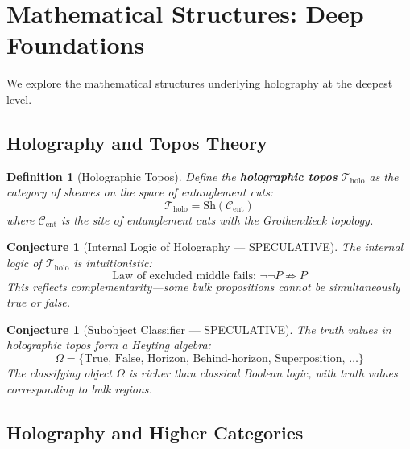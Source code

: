 \documentclass[12pt,a4paper]{article}
\newtheorem{conjecture}[theorem]{Conjecture}
\newtheorem{definition}[theorem]{Definition}
\begin{document}
\section{Mathematical Structures: Deep Foundations}

We explore the mathematical structures underlying holography at the deepest level.

\subsection{Holography and Topos Theory}

\begin{definition}[Holographic Topos]
Define the \textbf{holographic topos} $\mathcal{T}_{\text{holo}}$ as the category of sheaves on the space of entanglement cuts:
\begin{equation}
\mathcal{T}_{\text{holo}} = \text{Sh}(\mathcal{C}_{\text{ent}})
\end{equation}
where $\mathcal{C}_{\text{ent}}$ is the site of entanglement cuts with the Grothendieck topology.
\end{definition}

\begin{conjecture}[Internal Logic of Holography --- SPECULATIVE]
The internal logic of $\mathcal{T}_{\text{holo}}$ is intuitionistic:
\begin{equation}
\text{Law of excluded middle fails: } \neg\neg P \not\Rightarrow P
\end{equation}
This reflects complementarity---some bulk propositions cannot be simultaneously true or false.
\end{conjecture}

\begin{conjecture}[Subobject Classifier --- SPECULATIVE]
The truth values in holographic topos form a Heyting algebra:
\begin{equation}
\Omega = \{ \text{True, False, Horizon, Behind-horizon, Superposition, } \ldots \}
\end{equation}
The classifying object $\Omega$ is richer than classical Boolean logic, with truth values corresponding to bulk regions.
\end{conjecture}

\subsection{Holography and Higher Categories}
\end{document}
